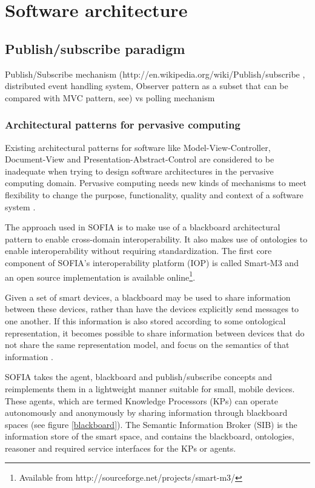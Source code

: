 \chapter{Software architecture}
\label{SoftwareArchitecture}



\section{Publish/subscribe paradigm}

Publish/Subscribe mechanism (http://en.wikipedia.org/wiki/Publish/subscribe , distributed event handling system, Observer pattern as a subset that can be compared with MVC pattern, see) vs polling mechanism



\subsection{Architectural patterns for pervasive computing}

Existing architectural patterns for software like Model-View-Controller, Document-View and Presentation-Abstract-Control are considered to be inadequate when trying to design software architectures in the pervasive computing domain. Pervasive computing needs new kinds of mechanisms to meet flexibility to change the purpose, functionality, quality and context of a software system \cite{Niemela2004}. 

The approach used in SOFIA is to make use of a blackboard architectural pattern to enable cross-domain interoperability. It also makes use of ontologies to enable interoperability without requiring standardization. The first core component of SOFIA's interoperability platform (IOP) is called Smart-M3 and an open source implementation is available online\footnote{Available from http://sourceforge.net/projects/smart-m3/}. 

Given a set of smart devices, a blackboard may be used to share information between these devices, rather than have the devices explicitly send messages to one another. If this information is also stored according to some ontological representation, it becomes possible to share information between devices that do not share the same representation model, and focus on the semantics of that information \cite{Oliver2008}.

SOFIA takes the agent, blackboard and publish/subscribe concepts and reimplements them in a lightweight manner suitable for small, mobile devices. These agents, which are termed Knowledge Processors (KPs) can operate autonomously and anonymously by sharing information through blackboard spaces (see figure \ref{blackboard}). The Semantic Information Broker (SIB) is the information store of the smart space, and contains the blackboard, ontologies, reasoner and required service interfaces for the KPs or agents.

